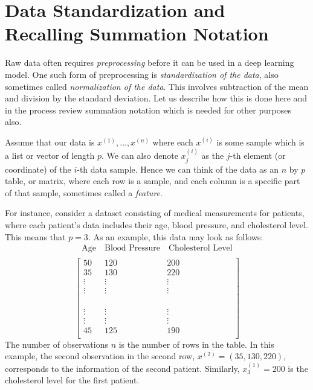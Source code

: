 \documentclass[12pt]{article}
\begin{document}
\section{Data Standardization and Recalling Summation Notation}
\label{sec:summation}

Raw data often requires \textit{preprocessing} before it can be used in a deep learning model. One such form of preprocessing is \textit{standardization of the data}, also sometimes called \textit{normalization of the data}. This involves subtraction of the mean and division by the standard deviation. Let us describe how this is done here and in the process review summation notation which is needed for other purposes also.

Assume that our data is $x^{(1)}, \ldots, x^{(n)}$ where each $x^{(i)}$ is some sample which is a list or vector of length $p$. We can also denote $x_j^{(i)}$ as the $j$-th element (or coordinate) of the $i$-th data sample. Hence we can think of the data as an $n$ by $p$ table, or matrix, where each row is a sample, and each column is a specific part of that sample, sometimes called a {\em feature}.

For instance, consider a dataset consisting of medical measurements for patients, where each patient's data includes their age, blood pressure, and cholesterol level. This means that $p=3$. As an example, this data may look as follows:
%
\[
\begin{array}{c}
\text{Age} \quad \text{Blood Pressure} \quad \text{Cholesterol Level} \\
\end{array}
\]
\begin{equation}
\label{eq:data-table}
\left[ \begin{array}{ccc}
50 & 120 & 200 \\
35 & 130 & 220 \\
\vdots & \vdots & \vdots \\
\vdots & \vdots & \vdots \\
\phantom{\text{Age}} & \phantom{\text{Blood Pressure}} & \phantom{\text{Cholesterol Level}}\\
\vdots & \vdots & \vdots \\
\vdots & \vdots & \vdots \\
45 & 125 & 190 \\
\end{array} \right]
\end{equation}
%
The number of observations $n$ is the number of rows in the table.
In this example, the second observation in the second row, $x^{(2)}= (35,130,220)$, corresponds to the information of the second patient. Similarly, $x_3^{(1)} = 200$ is the cholesterol level for the first patient. 
\end{document}
